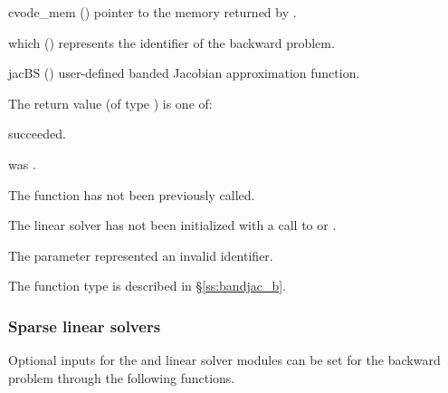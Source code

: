 {
  \begin{args}
  \item[cvode\_mem] ()
    pointer to the {\cvodes} memory returned by .
  \item[which] ()
    represents the identifier of the backward problem.
  \item[jacBS] ()
    user-defined banded Jacobian approximation function.
  \end{args}
}
{
  The return value  (of type ) is one of:
  \begin{args}
  \item[\Id{CVDLS\_SUCCESS}] 
     succeeded.
  \item[\Id{CVDLS\_MEM\_NULL}]
     was .
  \item[\Id{CVDLS\_NO\_ADJ}]
    The function  has not been previously called.
  \item[\Id{CVDLS\_LMEM\_NULL}]
    The linear solver has not been initialized with a call to 
    or .
  \item[\Id{CVDLS\_ILL\_INPUT}]
    The parameter  represented an invalid identifier.
  \end{args}
}
{
  The function type  is described in \S\ref{ss:bandjac_b}.
}


\subsubsection{Sparse linear solvers}
Optional inputs for the {\cvklu} and {\cvsuperlumt} linear solver
modules can be set for the backward problem through the following
functions.

